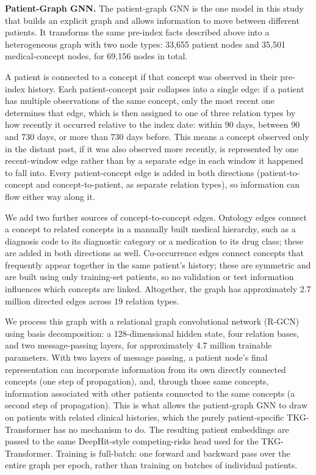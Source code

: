 \textbf{Patient-Graph GNN.}
The patient-graph GNN is the one model in this study that builds an explicit graph and allows information to move between different patients. It transforms the same pre-index facts described above into a heterogeneous graph with two node types: 33{,}655 patient nodes and 35{,}501 medical-concept nodes, for 69{,}156 nodes in total.

A patient is connected to a concept if that concept was observed in their pre-index history. Each patient-concept pair collapses into a single edge: if a patient has multiple observations of the same concept, only the most recent one determines that edge, which is then assigned to one of three relation types by how recently it occurred relative to the index date: within 90 days, between 90 and 730 days, or more than 730 days before. This means a concept observed only in the distant past, if it was also observed more recently, is represented by one recent-window edge rather than by a separate edge in each window it happened to fall into. Every patient-concept edge is added in both directions (patient-to-concept and concept-to-patient, as separate relation types), so information can flow either way along it.

We add two further sources of concept-to-concept edges. Ontology edges connect a concept to related concepts in a manually built medical hierarchy, such as a diagnosis code to its diagnostic category or a medication to its drug class; these are added in both directions as well. Co-occurrence edges connect concepts that frequently appear together in the same patient's history; these are symmetric and are built using only training-set patients, so no validation or test information influences which concepts are linked. Altogether, the graph has approximately 2.7 million directed edges across 19 relation types.

We process this graph with a relational graph convolutional network (R-GCN) using basis decomposition: a 128-dimensional hidden state, four relation bases, and two message-passing layers, for approximately 4.7 million trainable parameters. With two layers of message passing, a patient node's final representation can incorporate information from its own directly connected concepts (one step of propagation), and, through those same concepts, information associated with other patients connected to the same concepts (a second step of propagation). This is what allows the patient-graph GNN to draw on patients with related clinical histories, which the purely patient-specific TKG-Transformer has no mechanism to do. The resulting patient embeddings are passed to the same DeepHit-style competing-risks head used for the TKG-Transformer. Training is full-batch: one forward and backward pass over the entire graph per epoch, rather than training on batches of individual patients.

